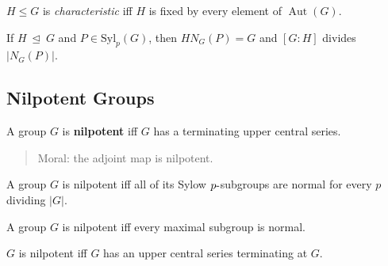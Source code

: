 \begin{definition}

\(H\leq G\) is \emph{characteristic} iff \(H\) is fixed by every element
of \({\operatorname{Aut}}(G)\).

\end{definition}

\begin{theorem}

If \(H{~\trianglelefteq~}G\) and \(P \in \mathrm{Syl}_p(G)\), then
\(H N_G(P) = G\) and \([G: H]\) divides
\({\left\lvert {N_G(P)} \right\rvert}\).

\end{theorem}

\hypertarget{nilpotent-groups}{%
\subsection{Nilpotent Groups}\label{nilpotent-groups}}

\begin{definition}[Nilpotent]

A group \(G\) is \textbf{nilpotent} iff \(G\) has a terminating upper
central series.

\end{definition}

\begin{quote}
Moral: the adjoint map is nilpotent.
\end{quote}

\begin{theorem}

A group \(G\) is nilpotent iff all of its Sylow \(p{\hbox{-}}\)subgroups
are normal for every \(p\) dividing \({\left\lvert {G} \right\rvert}\).

\end{theorem}

\begin{theorem}

A group \(G\) is nilpotent iff every maximal subgroup is normal.

\end{theorem}

\begin{theorem}

\(G\) is nilpotent iff \(G\) has an upper central series terminating at
\(G\).

\end{theorem}


